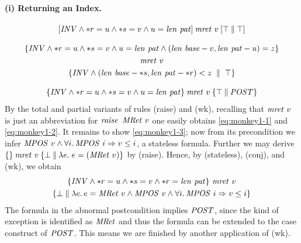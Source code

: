 \paragraph{(i) Returning an Index.} 
\begin{gather}
\label{eq:monkey1-1}
[\mathit{INV} \land {\ast r} = u \land {\ast s} = v
  \land u = \mathit{len}~\mathit{pat}]\:\mathit{mret}~v\:[\top\:\|\:\top]\\[2ex]\nonumber
\{\mathit{INV} \land {\ast r} = u \land {\ast s} = v \land u = \mathit{len}~\mathit{pat} \land
(\mathit{len}~\mathit{base}-v, \mathit{len}~\mathit{pat}-u) = z\} \\
\label{eq:monkey1-2}
  {\mathit{mret}~v}\\\nonumber
  \{\mathit{INV} \land (\mathit{len}~\mathit{base} - {\ast s}, 
    \mathit{len}~\mathit{pat}-{\ast r}) < z \;\parallel\; \top\}\\[2ex]
\label{eq:monkey1-3}
\{\mathit{INV} \land {\ast r} = u \land {\ast s} = v \land u = \mathit{len}~\mathit{pat}\}\:\mathit{mret}~v\:\{\top\:\|\:\mathit{POST}\}
\end{gather}
By the total and partial variants of rules (raise) and (wk), recalling that
$\mathit{mret}~v$ is just an abbreviation for $\mathit{raise}\,~\mathit{MRet}~v$ one easily
obtains \eqref{eq:monkey1-1} and \eqref{eq:monkey1-2}. It remains to show
\eqref{eq:monkey1-3}; now from its precondition we infer $\mathit{MPOS}\ v \land \forall i.\,
\mathit{MPOS}\ i \Rightarrow v \leq i$, a stateless formula.  Further we may derive
$\{\}\:\mathit{mret}~v\:\{\bot\:\|\:\lambda e.\; e = (\mathit{MRet}~v)\}$ by (raise). Hence, by
(stateless), (conj), and (wk), we obtain
\begin{multline*}
\{\mathit{INV}  \land {\ast r} = u \land {\ast s} = v \land {\ast r}
= \mathit{len}~\mathit{pat}\}\ \mathit{mret}~v\\
 \{\bot \parallel \lambda e.\, e = \mathit{MRet}\ v
\land \mathit{MPOS}\ v \land \forall i.\, \mathit{MPOS}\ i \Rightarrow v\leq i\}
\end{multline*}
The formula in the abnormal postcondition implies $\mathit{POST}$, since the
kind of exception  is identified as $\mathit{MRet}$ and thus the formula can be
extended to the case construct of
$\mathit{POST}$. This means we are finished by another application
of (wk).

